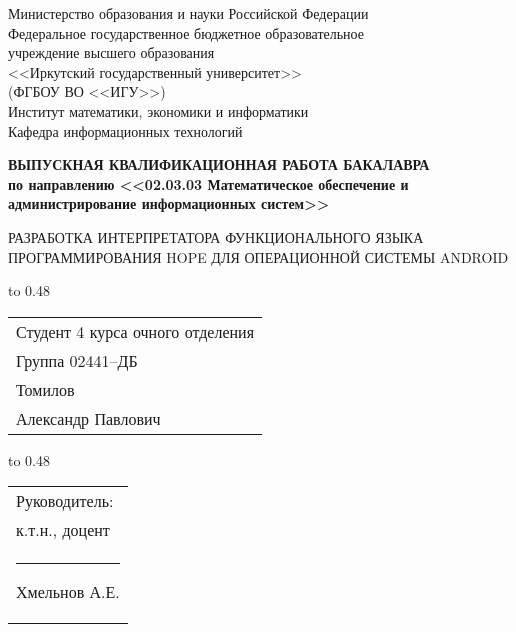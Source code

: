 \thispagestyle{empty}
\begin{center}
	Министерство образования и науки Российской Федерации\\
	Федеральное государственное бюджетное образовательное\\
	учреждение высшего образования\\
	<<Иркутский государственный университет>>\\
	(ФГБОУ ВО <<ИГУ>>)\\
	Институт математики, экономики и информатики\\
	Кафедра информационных технологий\\
\end{center}

\vspace{2.7cm}

\begin{center}
	{\bf 
		ВЫПУСКНАЯ КВАЛИФИКАЦИОННАЯ РАБОТА
		БАКАЛАВРА\\[1mm]
		по направлению <<02.03.03 Математическое обеспечение и \\[1mm] 
		администрирование информационных систем>>\\[1mm]
	}  
	
	\vspace{0.9cm}
	
	{
		РАЗРАБОТКА ИНТЕРПРЕТАТОРА ФУНКЦИОНАЛЬНОГО ЯЗЫКА
		ПРОГРАММИРОВАНИЯ HOPE ДЛЯ ОПЕРАЦИОННОЙ СИСТЕМЫ ANDROID
	} %
\end{center}

\vspace{1.1cm}

{
	\noindent\hbox to 0.48\textwidth {%
		\mbox{ } \hfil} %
	\begin{tabular}[t]{l}
		Студент 4 курса очного отделения\\
		Группа 02441--ДБ\\
		Томилов\\ Александр
		Павлович		
	\end{tabular}		
}

\vspace{0.8cm}

{
	\noindent\hbox to 0.48\textwidth {%
		\mbox{ } \hfil} %
	\begin{tabular}[t]{l}
		Руководитель:\\ к.т.н., доцент\\
		\rule{2.7cm}{0.5pt} Хмельнов А.Е.		
	\end{tabular}		
}

